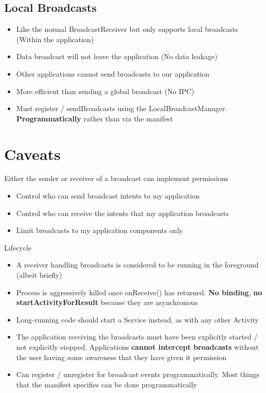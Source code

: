 \documentclass{article}
\begin{document}
\subsection{Local Broadcasts}

\begin{itemize}
  \item Like the normal BroadcastReceiver but only supports local broadcasts (Within the application) 
  \item Data broadcast will not leave the application (No data leakage)
  \item Other applications cannot send broadcasts to our application 
  \item More efficient than sending a global broadcast (No IPC)
  \item Must register / sendBroadcasts using the LocalBroadcastManager. \textbf{Programmatically} rather than via the manifest
\end{itemize}

\section{Caveats}

\begin{flushleft}
Either the sender or receiver of a broadcast can implement permissions
\begin{itemize}
  \item Control who can send broadcast intents to my application 
  \item Control who can receive the intents that my application broadcasts 
  \item Limit broadcasts to my application components only
\end{itemize}
Lifecycle
\begin{itemize}
  \item A receiver handling broadcasts is considered to be running in the foreground (albeit briefly) 
  \item Process is aggressively killed once onReceive() has returned. \textbf{No binding}, \textbf{no startActivityForResult} because they are asynchronous
  \item Long-running code should start a Service instead, as with any other Activity
\end{itemize}
\begin{itemize}
  \item The application receiving the broadcasts must have been explicitly started / not explicitly stopped. Applications \textbf{cannot intercept broadcasts} without the user having some awareness that they have given it permission 
  \item Can register / unregister for broadcast events programmatically. Most things that the manifest specifies can be done programmatically
\end{itemize}
\end{flushleft}
\end{document}

